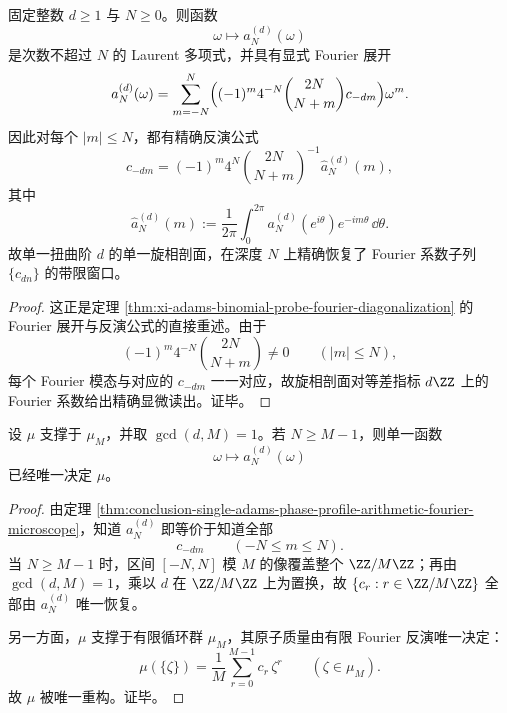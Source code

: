 \begin{theorem}\label{thm:conclusion-single-adams-phase-profile-arithmetic-fourier-microscope}
固定整数 \(d\ge1\) 与 \(N\ge0\)。则函数
\[
\omega\longmapsto a_N^{(d)}(\omega)
\]
是次数不超过 \(N\) 的 Laurent 多项式，并具有显式 Fourier 展开
\[
a_N^{(d)}(\omega)
=
\sum_{m=-N}^{N}
\Bigl(
(-1)^m4^{-N}\binom{2N}{N+m}c_{-dm}
\Bigr)\omega^m.
\]
因此对每个 \(|m|\le N\)，都有精确反演公式
\[
c_{-dm}
=
(-1)^m4^N\binom{2N}{N+m}^{-1}\widehat a_N^{(d)}(m),
\]
其中
\[
\widehat a_N^{(d)}(m)
:=
\frac1{2\pi}\int_0^{2\pi}a_N^{(d)}(e^{i\theta})e^{-im\theta}\,\dd\theta.
\]
故单一扭曲阶 \(d\) 的单一旋相剖面，在深度 \(N\) 上精确恢复了 Fourier 系数子列 \(\{c_{dn}\}\) 的带限窗口。
\end{theorem}
\begin{proof}
这正是定理 \ref{thm:xi-adams-binomial-probe-fourier-diagonalization} 的 Fourier 展开与反演公式的直接重述。由于
\[
(-1)^m4^{-N}\binom{2N}{N+m}\neq 0
\qquad(|m|\le N),
\]
每个 Fourier 模态与对应的 \(c_{-dm}\) 一一对应，故旋相剖面对等差指标 \(d\ZZ\) 上的 Fourier 系数给出精确显微读出。证毕。
\end{proof}

\begin{corollary}\label{cor:conclusion-single-finite-order-adams-profile-reconstructs-finite-cyclotomic-measure}
设 \(\mu\) 支撑于 \(\mu_M\)，并取 \(\gcd(d,M)=1\)。若 \(N\ge M-1\)，则单一函数
\[
\omega\longmapsto a_N^{(d)}(\omega)
\]
已经唯一决定 \(\mu\)。
\end{corollary}
\begin{proof}
由定理 \ref{thm:conclusion-single-adams-phase-profile-arithmetic-fourier-microscope}，知道 \(a_N^{(d)}\) 即等价于知道全部
\[
c_{-dm}
\qquad(-N\le m\le N).
\]
当 \(N\ge M-1\) 时，区间 \([-N,N]\) 模 \(M\) 的像覆盖整个 \(\ZZ/M\ZZ\)；再由 \(\gcd(d,M)=1\)，乘以 \(d\) 在 \(\ZZ/M\ZZ\) 上为置换，故 \(\{c_r:r\in\ZZ/M\ZZ\}\) 全部由 \(a_N^{(d)}\) 唯一恢复。

另一方面，\(\mu\) 支撑于有限循环群 \(\mu_M\)，其原子质量由有限 Fourier 反演唯一决定：
\[
\mu(\{\zeta\})
=
\frac1M\sum_{r=0}^{M-1}c_r\,\zeta^r
\qquad(\zeta\in\mu_M).
\]
故 \(\mu\) 被唯一重构。证毕。
\end{proof}

